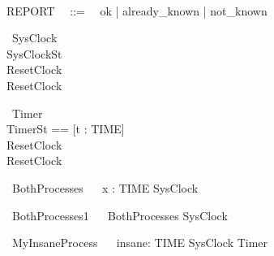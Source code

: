 \documentclass{llncs}
\begin{document}
\begin{zed}
\\
REPORT ~~::=~~ ok | already\_known | not\_known\\
\end{zed}
\begin{circus}
\circprocess ~SysClock ~\circdef~
\circbegin\\
  \circstate SysClockSt \\
  ResetClock ~\circdef~\Skip\\
  \circspot ResetClock\\
  \circend
\end{circus}
\begin{circus}
\circprocess ~Timer ~\circdef~
\circbegin\\
  \circstate TimerSt == [t : TIME]\\
  ResetClock ~\circdef~\Skip\\
  \circspot ResetClock\\
  \circend
\end{circus}
\begin{circus}
\circprocess ~BothProcesses ~\circdef~ \Semi x : TIME \circspot SysClock\\
\end{circus}
\begin{circus}
\circprocess ~BothProcesses1 ~\circdef~ BothProcesses \circseq SysClock\\
\end{circus}
\begin{circus}
\circprocess ~MyInsaneProcess ~\circdef~ \Semi insane: TIME \circspot SysClock \circseq Timer\\
\end{circus}

\end{document}

